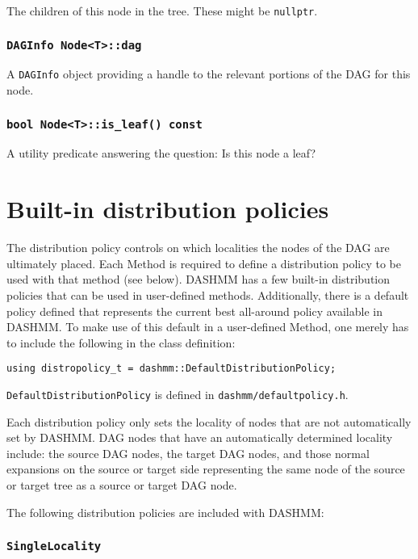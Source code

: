 The children of this node in the tree. These might be \texttt{nullptr}.

\subsubsection{\texttt{DAGInfo Node<T>::dag}}

A \texttt{DAGInfo} object providing a handle to the relevant portions of the
DAG for this node.

\subsubsection{\texttt{bool Node<T>::is\_leaf() const}}

A utility predicate answering the question: Is this node a leaf?


\section{Built-in distribution policies}

The distribution policy controls on which localities the nodes of the DAG
are ultimately placed. Each Method is required to define a distribution policy
to be used with that method (see below). DASHMM has a few built-in distribution
policies that can be used in user-defined methods. Additionally, there is a
default policy defined that represents the current best all-around policy
available in DASHMM. To make use of this default in a user-defined Method,
one merely has to include the following in the class definition:

\begin{verbatim}
using distropolicy_t = dashmm::DefaultDistributionPolicy;
\end{verbatim}

\noindent \texttt{DefaultDistributionPolicy} is defined in
\texttt{dashmm/defaultpolicy.h}.

Each distribution policy only sets the locality of nodes that are not
automatically set by DASHMM. DAG nodes that have an automatically determined
locality include: the source DAG nodes, the target DAG nodes, and those
normal expansions on the source or target side representing the same node of
the source or target tree as a source or target DAG node.

The following distribution policies are included with DASHMM:

\subsubsection{\texttt{SingleLocality}}

